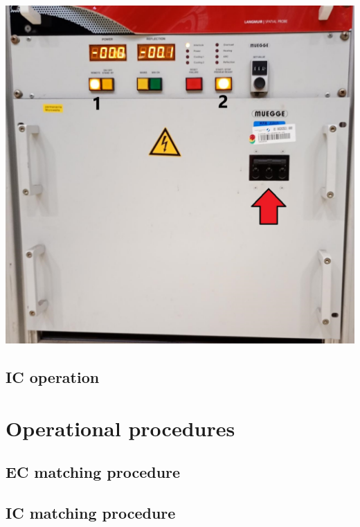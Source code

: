 \documentclass[fleqn,a4paper,20pt]{article}
\begin{document}
\begin{minipage}{.35\textwidth}
\centering
\includegraphics[width=\linewidth]{EC1}
\captionsetup{width=0.75\textwidth}
\label{EC1}
\end{minipage}





\newpage
\subsection{IC operation}




\newpage	
\section{Operational procedures}%


\subsection{EC matching procedure}


\subsection{IC matching procedure}
\end{document}

